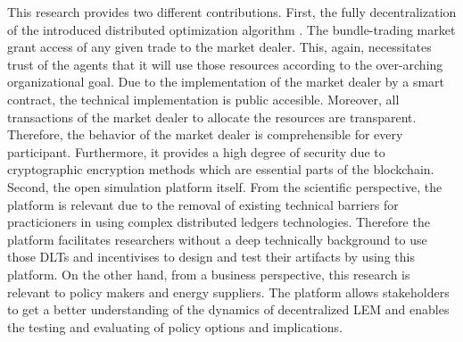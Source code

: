 This research provides two different contributions. First, the fully decentralization of the introduced distributed optimization algorithm . 
The bundle-trading market grant access of any given trade to the market dealer. This, again, necessitates trust of the agents that it will use those resources according to the over-arching organizational goal. Due to the implementation of the market dealer by a smart contract, the technical implementation is public accesible. Moreover, all transactions of the market dealer to allocate the resources are transparent. Therefore, the behavior of the market dealer is comprehensible for every participant. Furthermore, it provides a high degree of security due to cryptographic encryption methods which are essential parts of the blockchain.
Second, the open simulation platform itself. From the scientific perspective, the platform is relevant due to the removal of existing technical barriers for practicioners in using complex distributed ledgers technologies. Therefore the platform facilitates researchers without a deep technically background to use those DLTs and incentivises to design and test their artifacts by using this platform. 
On the other hand, from a business perspective, this research is relevant to policy makers and energy suppliers. The platform allows stakeholders to get a better understanding of the dynamics of decentralized LEM and enables the testing and evaluating of policy options and implications. 

  